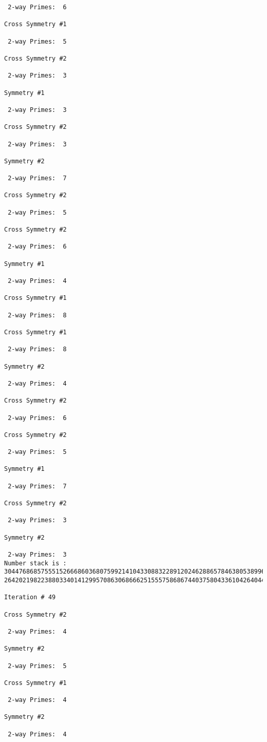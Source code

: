 {{{{\begin{verbatim}
 2-way Primes: 	6

Cross Symmetry #1

 2-way Primes: 	5

Cross Symmetry #2

 2-way Primes: 	3

Symmetry #1

 2-way Primes: 	3

Cross Symmetry #2

 2-way Primes: 	3

Symmetry #2

 2-way Primes: 	7

Cross Symmetry #2

 2-way Primes: 	5

Cross Symmetry #2

 2-way Primes: 	6

Symmetry #1

 2-way Primes: 	4

Cross Symmetry #1

 2-way Primes: 	8

Cross Symmetry #1

 2-way Primes: 	8

Symmetry #2

 2-way Primes: 	4

Cross Symmetry #2

 2-way Primes: 	6

Cross Symmetry #2

 2-way Primes: 	5

Symmetry #1

 2-way Primes: 	7

Cross Symmetry #2

 2-way Primes: 	3

Symmetry #2

 2-way Primes: 	3
Number stack is :
30447686857555152666860368075992141043308832289120246288657846380538996794608835958544046240163340857
26420219822388033401412995708630686662515557586867440375804336104264044585953880649769983508364875688

Iteration #	49

Cross Symmetry #2

 2-way Primes: 	4

Symmetry #2

 2-way Primes: 	5

Cross Symmetry #1

 2-way Primes: 	4

Symmetry #2

 2-way Primes: 	4


\end{verbatim}}}}}
